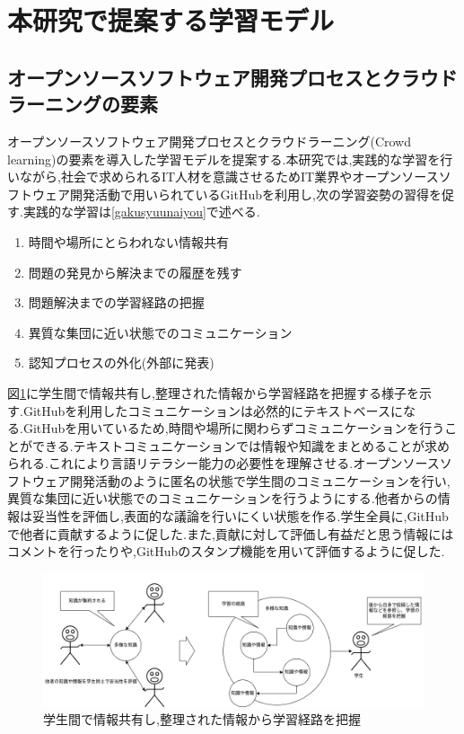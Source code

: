 \documentclass[11pt, a4paper]{jreport}
\begin{document}
\section{本研究で提案する学習モデル}\label{gakusyuumoderu_base}

\subsection{オープンソースソフトウェア開発プロセスとクラウドラーニングの要素}

オープンソースソフトウェア開発プロセスとクラウドラーニング(Crowd learning)の要素を導入した学習モデルを提案する.本研究では,実践的な学習を行いながら,社会で求められるIT人材を意識させるためIT業界やオープンソースソフトウェア開発活動で用いられているGitHub\cite{bib:github}を利用し,次の学習姿勢の習得を促す.実践的な学習は\ref{gakusyuunaiyou}で述べる.

\begin{enumerate}[label=\textbf{(\alph*)}]
\item 時間や場所にとらわれない情報共有
\item 問題の発見から解決までの履歴を残す
\item 問題解決までの学習経路の把握
\item 異質な集団に近い状態でのコミュニケーション
\item 認知プロセスの外化(外部に発表)
\end{enumerate}

図\ref{fig:chisikimap}に学生間で情報共有し,整理された情報から学習経路を把握する様子を示す.GitHubを利用したコミュニケーションは必然的にテキストベースになる.GitHubを用いているため,時間や場所に関わらずコミュニケーションを行うことができる.テキストコミュニケーションでは情報や知識をまとめることが求められる.これにより言語リテラシー能力の必要性を理解させる.オープンソースソフトウェア開発活動のように匿名の状態で学生間のコミュニケーションを行い,異質な集団に近い状態でのコミュニケーションを行うようにする.他者からの情報は妥当性を評価し,表面的な議論を行いにくい状態を作る.学生全員に,GitHubで他者に貢献するように促した.また,貢献に対して評価し有益だと思う情報にはコメントを行ったりや,GitHubのスタンプ機能を用いて評価するように促した.

\begin{figure}[H]
\begin{center}
\includegraphics[width=140mm]{./img/chisikimap.png}
\caption{学生間で情報共有し,整理された情報から学習経路を把握}
\label{fig:chisikimap}
\end{center}
\end{figure}
\end{document}
